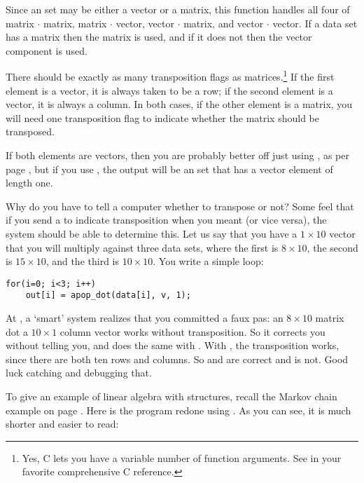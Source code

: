 Since an  set may be either a vector or a matrix, this
function handles all four of matrix $\cdot$ matrix,
matrix $\cdot$ vector, vector $\cdot$ matrix, and vector $\cdot$ vector.
If a data set has a matrix then the matrix is used, and if it does not
then the vector component is used.

There should be exactly as many transposition flags as
matrices.\footnote{Yes, C lets you have a variable number of function
arguments. See  in your favorite comprehensive
C reference.}
If the first element is a vector, it is always taken to be a row;
if the second element is a vector, it is always a column. In both cases,
if the other element is a matrix, you will need one transposition flag
to indicate whether the matrix should be transposed.

If both elements are vectors, then you are probably better off just
using  , as per page \pageref{ddot}, but if you use
, the output will be an  set that has
a vector element of length one.

Why do you have to tell a computer whether to transpose or not? Some
feel that if you
send a  to indicate transposition when you meant  (or vice versa), the system should be able to
determine this. Let us say that you have a $1\times 10$ vector that you
will multiply against three data sets, where the first is $8 \times 10$,
the second is $15 \times 10$, and the third is $10 \times 10$. You write
a simple  loop:
\begin{lstlisting}
for(i=0; i<3; i++)
    out[i] = apop_dot(data[i], v, 1);
\end{lstlisting}
At , a `smart' system realizes that you committed a faux pas:
an $8 \times 10$ matrix dot a $10 \times 1$ column vector works without
transposition. So it corrects you without telling you, and does the same
with . With , the transposition works, since
there are both ten rows and columns. So  and  are
correct and  is not. Good luck catching and debugging that.

To give an example of linear algebra with  structures,
recall the Markov chain example on page \pageref{markovone}. Here is the
program redone using . As you can see, it is much shorter
and easier to read: \label{markovtwo}


